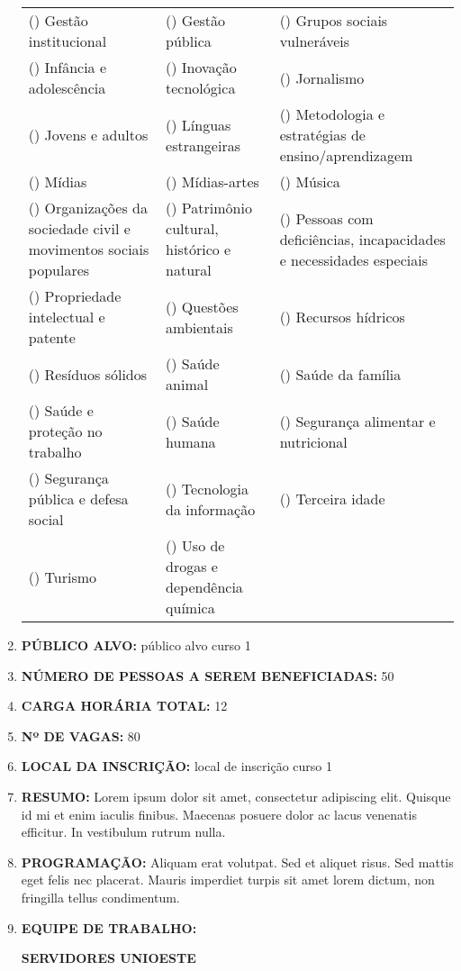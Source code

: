 \documentclass[12pt,a4paper,oneside]{article}%
\begin{document}
\begin{enumerate}
{\begin{tabularx}{\linewidth}{X|X|X}
() Gestão institucional&() Gestão pública&() Grupos sociais vulneráveis\\%
() Infância e adolescência&() Inovação tecnológica&() Jornalismo\\%
() Jovens e adultos&() Línguas estrangeiras&() Metodologia e estratégias de ensino/aprendizagem\\%
() Mídias&() Mídias{-}artes&() Música\\%
() Organizações da sociedade civil e movimentos sociais populares&() Patrimônio cultural, histórico e natural&() Pessoas com deficiências, incapacidades e necessidades especiais\\%
() Propriedade intelectual e patente&() Questões ambientais&() Recursos hídricos\\%
() Resíduos sólidos&() Saúde animal&() Saúde da família\\%
() Saúde e proteção no trabalho&() Saúde humana&() Segurança alimentar e nutricional\\%
() Segurança pública e defesa social&() Tecnologia da informação&() Terceira idade\\%
() Turismo&() Uso de drogas e dependência química&\\%
\end{tabularx}%
}%
\item%
\textbf{PÚBLICO ALVO: }%
público alvo curso 1%
\item%
\textbf{NÚMERO DE PESSOAS A SEREM BENEFICIADAS: }%
50%
\item%
\textbf{CARGA HORÁRIA TOTAL: }%
12%
\item%
\textbf{Nº DE VAGAS: }%
80%
\item%
\textbf{LOCAL DA INSCRIÇÃO: }%
local de inscrição curso 1%
\item%
\textbf{RESUMO: }%
\newline%
Lorem ipsum dolor sit amet, consectetur adipiscing elit. Quisque id mi et enim iaculis finibus. Maecenas posuere dolor ac lacus venenatis efficitur. In vestibulum rutrum nulla.%
\item%
\textbf{PROGRAMAÇÃO: }%
Aliquam erat volutpat. Sed et aliquet risus. Sed mattis eget felis nec placerat. Mauris imperdiet turpis sit amet lorem dictum, non fringilla tellus condimentum.%
\item%
\textbf{EQUIPE DE TRABALHO: }%
\newline%
\begin{mdframed}[innertopmargin=5pt, innerleftmargin=3pt, innerrightmargin=3pt]%
\textbf{SERVIDORES UNIOESTE }%
\newline%

\end{mdframed}
\end{enumerate}
\end{document}
